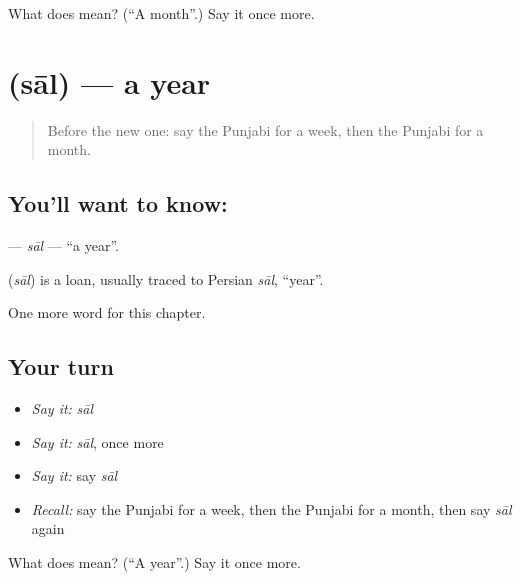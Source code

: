 \begin{tcolorbox}[breakable,colback=teal!4,colframe=teal!35!black,title={Before you move on}]
What does  mean? (\textquotedblleft{}A month\textquotedblright{}.) Say it once more.
\end{tcolorbox}
\section[\texorpdfstring{\pa{ਸਾਲ} (sāl)}{ਸਾਲ (sāl)}]{ (sāl) — a year}

\label{lesson:PA-C86-sal}



\begin{quote}
Before the new one: say the Punjabi for a week, then the Punjabi for a month.
\end{quote}

\subsection*{You'll want to know: }
\textbf{} — \emph{sāl} — \textquotedblleft{}a year\textquotedblright{}.

\begin{cousinweb}
\textbf{} (\emph{sāl}) is a loan, usually traced to Persian \emph{sāl}, \textquotedblleft{}year\textquotedblright{}.
\end{cousinweb}

\begin{grammarlens}[title={What you've built}]
One more word for this chapter.
\end{grammarlens}

\subsection*{Your turn}
\begin{itemize}
\raggedright
  \item \emph{Say it:} \emph{sāl}
  \item \emph{Say it:} \emph{sāl}, once more
  \item \emph{Say it:} say \emph{sāl}
  \item \emph{Recall:} say the Punjabi for a week, then the Punjabi for a month, then say \emph{sāl} again
\end{itemize}

\begin{tcolorbox}[breakable,colback=teal!4,colframe=teal!35!black,title={Before you move on}]
What does  mean? (\textquotedblleft{}A year\textquotedblright{}.) Say it once more.
\end{tcolorbox}
